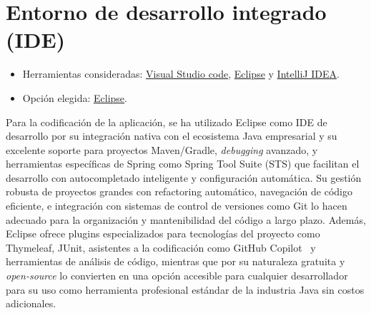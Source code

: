 \section{Entorno de desarrollo integrado (IDE)}\label{entorno-de-desarrollo-integrado}

\begin{itemize}
\tightlist
\item
  Herramientas consideradas: 
  \href{https://code.visualstudio.com/}{Visual Studio code}, 
  \href{https://eclipse.org/}{Eclipse} y
  \href{https://www.jetbrains.com/idea/}{IntelliJ IDEA}.
\item
  Opción elegida: \href{https://eclipse.org/}{Eclipse}.
\end{itemize}

Para la codificación de la aplicación, se ha utilizado Eclipse como IDE de desarrollo por su integración nativa con el ecosistema Java empresarial y su excelente soporte para proyectos Maven/Gradle, \emph{debugging} avanzado, y herramientas específicas de Spring como Spring Tool Suite (STS) que facilitan el desarrollo con autocompletado inteligente y configuración automática. Su gestión robusta de proyectos grandes con refactoring automático, navegación de código eficiente, e integración con sistemas de control de versiones como Git lo hacen adecuado para la organización y mantenibilidad del código a largo plazo. Además, Eclipse ofrece plugins especializados para tecnologías del proyecto como Thymeleaf, JUnit, asistentes a la codificación como GitHub Copilot~\cite{github-copilot} y herramientas de análisis de código, mientras que por su naturaleza gratuita y \emph{open-source} lo convierten en una opción accesible para cualquier desarrollador para su uso como herramienta profesional estándar de la industria Java sin costos adicionales.
